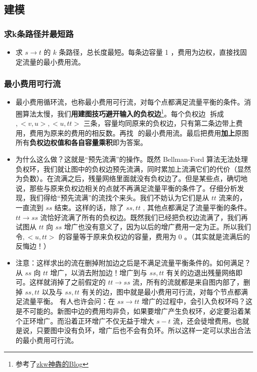 \documentclass[]{ctexart}
\begin{document}
\hypertarget{header-n574}{%
\subsection{建模}\label{header-n574}}

\hypertarget{header-n575}{%
\subsubsection{求k条路径并最短路}\label{header-n575}}

\begin{itemize}
\item
  求 \(s \rightarrow t\) 的 \(k\) 条路径，总长度最短。每条边容量 1
  ，费用为边权，直接找固定流量的最小费用流。
\end{itemize}

\hypertarget{header-n580}{%
\subsubsection{最小费用可行流}\label{header-n580}}

\begin{itemize}
\item
  最小费用循环流，也称最小费用可行流，对每个点都满足流量平衡的条件。消圈算法太慢，我们\textbf{用建图技巧避开输入的负权边}\footnote{参考了\href{https://artofproblemsolving.com/community/c1368h1020435__zkw}{zkw神犇的Blog}}。每个负权边
  \(<u, v>\) 拆成 \(<ss, v>, <v, u>, <u, tt>\)
  三条，容量均同原来的负权边，只有第二条边带上费用，费用为原来的费用的相反数。再找
  \(<ss, tt>\)
  的最小费用流。最后把费用\textbf{加上}原图所有\textbf{负权边权值和各自容量乘积}即为答案。
\end{itemize}

\begin{itemize}
\item
  为什么这么做？这就是``预先流满''的操作。既然 Bellman-Ford
  算法无法处理负权环，我们就让图中的负权边预先流满，同时累加上流满它们的代价（显然为负数）。在流满之后，残量网络里面就没有负权边了。但是某些点，确切地说，那些与原来负权边相关的点就不再满足流量平衡的条件了。仔细分析发现，我们得给``预先流满''的流找个来头。我们不妨认为它们是从
  \(tt\) 流来的，一直流到 \(ss\) 结束。这样的话，除了 \(ss, tt\) ,
  其他点都满足了流量平衡的条件。\(tt \rightarrow ss\)
  流恰好流满了所有的负权边。既然我们已经把负权边流满了，我们再试图从
  \(tt\) 向 \(ss\)
  增广也没有意义了，因为以后的增广费用一定为正。所以我们令\(<ss,  v>, <u, tt>\)
  的容量等于原来负权边的容量，费用为 0 。（其实就是流满后的反悔边！）
\item
  注意：这样求出的流在删掉附加边之后是不满足流量平衡条件的。如何满足？从
  \(ss\) 向 \(tt\) 增广，以消去附加边！增广到与 \(ss, tt\)
  有关的边退出残量网络即可。这样就消掉了之前假定的 \(tt \rightarrow ss\)
  流，所有的流就都是来自图内部了，删掉 \(ss, tt\) 以及与 \(ss, tt\)
  有关的边，图中就是最小费用可行流，对每个节点都满足流量平衡。
  有人也许会问：在 \(ss \rightarrow tt\)
  增广的过程中，会引入负权环吗？这是不可能的。新图中边的费用均非负，如果要增广产生负权环，必定要沿着某个正环增广。而沿着正环增广不仅无益于增大
  \(s-t\)
  流，还会徒增费用。也就是说，只要图中没有负环，增广后也不会有负环。所以这样一定可以求出合法的最小费用可行流。
\end{itemize}
\end{document}
